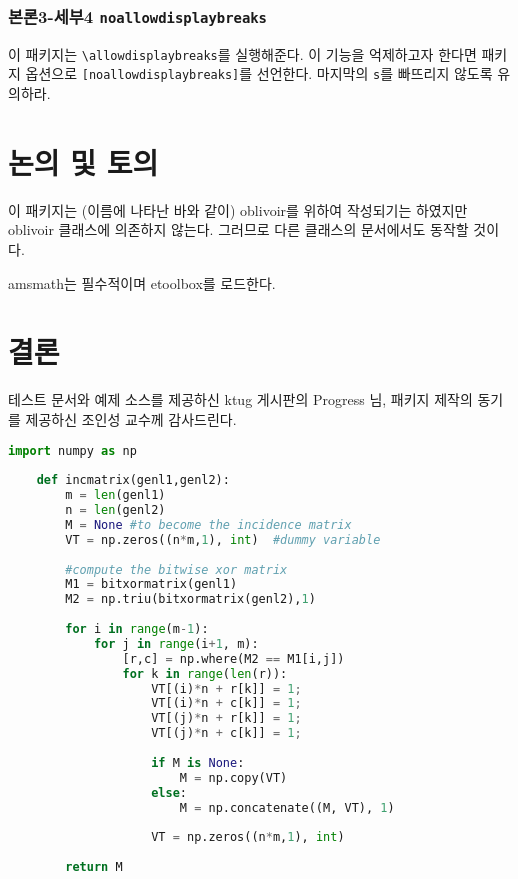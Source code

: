 \documentclass[a4paper,amsmath]{oblivoir}
\newcommand\pkg[1]{\textsf{#1}}
\begin{document}
\subsubsection{본론3-세부4  \texttt{noallowdisplaybreaks}}

이 패키지는 \verb|\allowdisplaybreaks|를 실행해준다. 이 기능을 억제하고자 한다면
패키지 옵션으로 \verb|[noallowdisplaybreaks]|를 선언한다. 마지막의 \verb|s|를 빠뜨리지 않도록
유의하라.

\section{논의 및 토의}

이 패키지는 (이름에 나타난 바와 같이) \pkg{oblivoir}를 위하여 작성되기는 하였지만 \pkg{oblivoir} 클래스에
의존하지 않는다. 그러므로 다른 클래스의 문서에서도 동작할 것이다.

\pkg{amsmath}는 필수적이며 \pkg{etoolbox}를 로드한다.

\section{결론}

테스트 문서와 예제 소스를 제공하신 ktug 게시판의 Progress 님, 패키지 제작의 동기를 제공하신 조인성 교수께 감사드린다.

\begin{lstlisting}[language=Python, caption={Python example}]
    import numpy as np
        
    def incmatrix(genl1,genl2):
        m = len(genl1)
        n = len(genl2)
        M = None #to become the incidence matrix
        VT = np.zeros((n*m,1), int)  #dummy variable
        
        #compute the bitwise xor matrix
        M1 = bitxormatrix(genl1)
        M2 = np.triu(bitxormatrix(genl2),1) 
    
        for i in range(m-1):
            for j in range(i+1, m):
                [r,c] = np.where(M2 == M1[i,j])
                for k in range(len(r)):
                    VT[(i)*n + r[k]] = 1;
                    VT[(i)*n + c[k]] = 1;
                    VT[(j)*n + r[k]] = 1;
                    VT[(j)*n + c[k]] = 1;
                    
                    if M is None:
                        M = np.copy(VT)
                    else:
                        M = np.concatenate((M, VT), 1)
                    
                    VT = np.zeros((n*m,1), int)
        
        return M
    \end{lstlisting}
\end{document}
